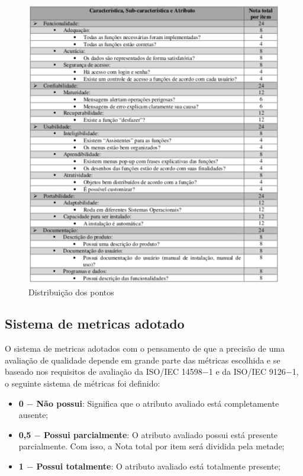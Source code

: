   \begin{figure}[!h]
    \centering
    \includegraphics[width=13cm, keepaspectratio=true]{figuras/ferramentas/pontos.eps}
    \caption{Distribuição dos pontos}
  \end{figure}

\subsection{Sistema de metricas adotado}

  O sistema de metricas adotados com o pensamento de que  a precisão de uma avaliação de qualidade depende em grande parte das métricas
  escolhida e se baseado nos requisitos de avaliação da ISO/IEC 14598$-$1 e da ISO/IEC 9126$-$1, o seguinte sistema de métricas foi definido:

  \begin{itemize}
    \item \textbf{0 $-$ Não possui}: Significa que o atributo avaliado está completamente ausente;
    \item \textbf{0,5 $-$ Possui parcialmente}: O atributo avaliado possui está presente parcialmente. Com isso, a Nota total por item
      será dividida pela metade;
    \item \textbf{1 $-$ Possui totalmente}: O atributo avaliado está totalmente presente;
  \end{itemize}

